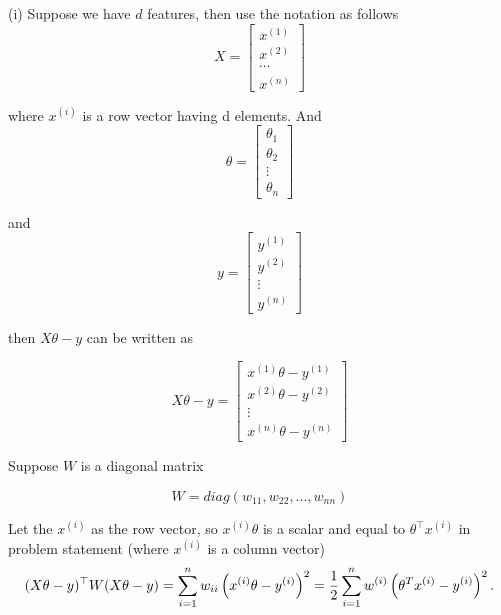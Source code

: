 \begin{answer}

(i) Suppose we have $d$ features, then use the notation as follows
\begin{equation*}
    X = \left[\begin{matrix}
       x^{(1)} \\ x^{(2)} \\ \cdots \\ x^{(n)}
      \end{matrix}
    \right]
  \end{equation*}

where $x^{(i)}$ is a row vector having d elements. And 
\begin{equation*}
\theta = \left[\begin{matrix}
       \theta_1 \\
       \theta_2 \\
       \vdots \\
       \theta_n
      \end{matrix}
    \right]
\end{equation*}

and 
\begin{equation*}
y = \left[\begin{matrix}
       y^{(1)} \\
       y^{(2)} \\
       \vdots \\
       y^{(n)}
      \end{matrix}
    \right]
\end{equation*}

then $X\theta - y$ can be written as 

\begin{equation*}
X\theta - y = \left[\begin{matrix}
       x^{(1)}\theta - y^{(1)} \\
       x^{(2)}\theta - y^{(2)} \\
       \vdots \\
       x^{(n)}\theta - y^{(n)}
      \end{matrix}
    \right]
\end{equation*}

Suppose $W$ is a diagonal matrix

\begin{equation*}
W = diag\left( w_{11}, w_{22}, ..., w_{nn} \right)
\end{equation*}

Let the $x^{(i)}$ as the row vector, so $x^{(i)}\theta$ is a scalar and equal to $\theta^\top x^{(i)}$ in problem statement (where $x^{(i)}$ is a column vector)
\begin{equation*}
    (X\theta - y)^\top W (X\theta - y) = \sum_{i=1}^{n} w_{ii}\left(x^{(i)}\theta - y^{(i)}\right)^2 = \frac{1}{2} \sum_{i=1}^{n} w^{(i)}
		\left(\theta^Tx^{(i)} - y^{(i)}\right)^2.
\end{equation*}


\end{answer}
